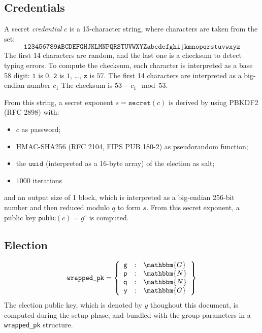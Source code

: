 \documentclass[a4paper]{article}
\newcommand{\G}{\mathbbm{G}}
\newcommand{\N}{\mathbbm{N}}
\newcommand{\public}{\textsf{public}}
\newcommand{\uuid}{\texttt{uuid}}
\begin{document}
\subsection{Credentials}
\label{credentials}

\newcommand{\secret}{\texttt{secret}}

A secret \emph{credential} $c$ is a 15-character string, where characters are
taken from the set:
\[\texttt{123456789ABCDEFGHJKLMNPQRSTUVWXYZabcdefghijkmnopqrstuvwxyz}\]
The first 14 characters are random, and the last one is a checksum to
detect typing errors. To compute the checksum, each character is
interpreted as a base 58 digit: $\texttt{1}$ is $0$, $\texttt{2}$ is
$1$, \dots, $\texttt{z}$ is $57$. The first 14 characters are
interpreted as a big-endian number $c_1$ The checksum is $53-c_1\mod
53$.

From this string, a secret exponent $s=\secret(c)$ is derived by using
PBKDF2 (RFC 2898) with:
\begin{itemize}
\item $c$ as password;
\item HMAC-SHA256 (RFC 2104, FIPS PUB 180-2) as pseudorandom function;
\item the $\uuid$ (interpreted as a 16-byte array) of the election as
  salt;
\item $1000$ iterations
\end{itemize}
and an output size of 1 block, which is interpreted as a big-endian
256-bit number and then reduced modulo $q$ to form $s$.  From this
secret exponent, a public key $\public(c)=g^s$ is computed.

\subsection{Election}
\label{elections}

\newcommand{\question}{\texttt{question}}

\begin{gather*}
  \texttt{wrapped\_pk}=\left\{
    \begin{array}{rcl}
      \textsf{g}&:&\G\\
      \textsf{p}&:&\N\\
      \textsf{q}&:&\N\\
      \textsf{y}&:&\G
    \end{array}
  \right\}
\end{gather*}
The election public key, which is denoted by $y$ thoughout this
document, is computed during the setup phase, and bundled with the
group parameters in a \texttt{wrapped\_pk} structure.
\end{document}
